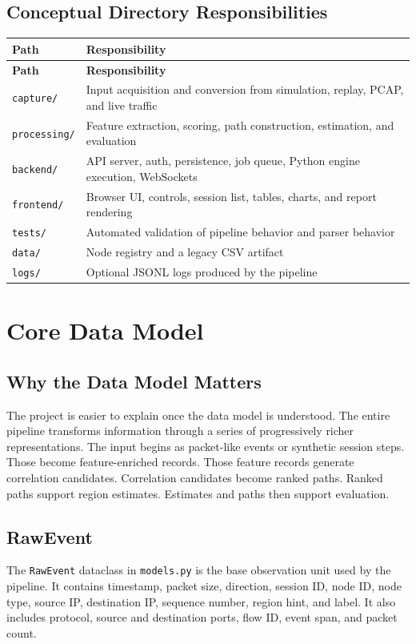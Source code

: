 \documentclass[12pt,a4paper]{report}
\begin{document}
\section{Conceptual Directory Responsibilities}
\begin{longtable}{p{4cm}p{10cm}}
\toprule
\textbf{Path} & \textbf{Responsibility} \\
\midrule
\endfirsthead
\toprule
\textbf{Path} & \textbf{Responsibility} \\
\midrule
\endhead
\texttt{capture/} & Input acquisition and conversion from simulation, replay, PCAP, and live traffic \\
\texttt{processing/} & Feature extraction, scoring, path construction, estimation, and evaluation \\
\texttt{backend/} & API server, auth, persistence, job queue, Python engine execution, WebSockets \\
\texttt{frontend/} & Browser UI, controls, session list, tables, charts, and report rendering \\
\texttt{tests/} & Automated validation of pipeline behavior and parser behavior \\
\texttt{data/} & Node registry and a legacy CSV artifact \\
\texttt{logs/} & Optional JSONL logs produced by the pipeline \\
\bottomrule
\end{longtable}

\chapter{Core Data Model}
\section{Why the Data Model Matters}
The project is easier to explain once the data model is understood. The entire pipeline transforms information through a series of progressively richer representations. The input begins as packet-like events or synthetic session steps. Those become feature-enriched records. Those feature records generate correlation candidates. Correlation candidates become ranked paths. Ranked paths support region estimates. Estimates and paths then support evaluation.

\section{RawEvent}
The \texttt{RawEvent} dataclass in \texttt{models.py} is the base observation unit used by the pipeline. It contains timestamp, packet size, direction, session ID, node ID, node type, source IP, destination IP, sequence number, region hint, and label. It also includes protocol, source and destination ports, flow ID, event span, and packet count.
\end{document}
